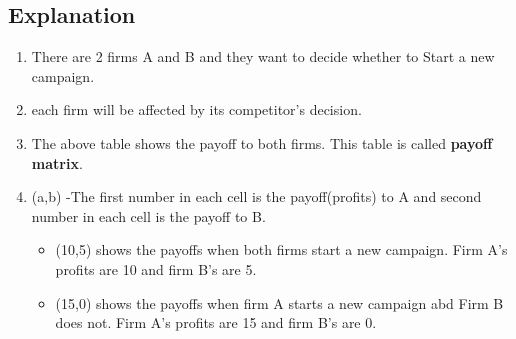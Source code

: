 \documentclass[]{report}
\begin{document}
\subsection{Explanation} 
\begin{enumerate}

\item There are 2 firms A and B and they want to decide whether to Start a new campaign. 
\item each firm will be affected by its competitor’s decision. 
\item The above table shows the payoff to both firms. This table is called \textbf{payoff matrix}. 
\item (a,b) -The first number in each cell is the payoff(profits) to A and second number in each cell 
is the payoff to B. 
\begin{itemize}
\item (10,5) shows the payoffs when both firms start a new campaign. 
Firm A’s profits are 10 and firm B’s are 5. 
\item (15,0) shows the payoffs when firm A starts a new campaign abd Firm B does not. 
Firm A’s profits are 15 and firm B’s are 0. 
\end{itemize}
\end{enumerate}

\newpage
\end{document}
